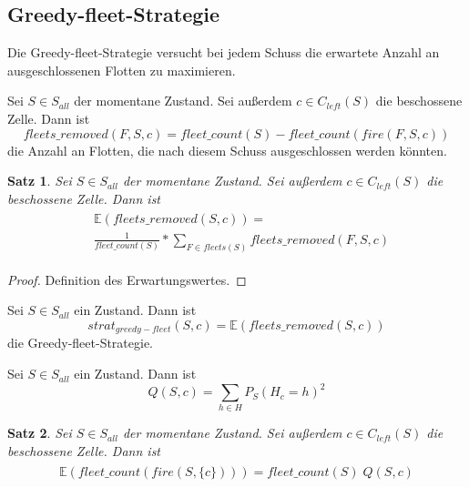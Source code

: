 \documentclass[a4paper,12pt]{llncs}
\numberwithin{equation}{section}
\newtheorem{satz}{Satz}
\begin{document}
\subsection{Greedy-fleet-Strategie}
Die Greedy-fleet-Strategie versucht bei jedem Schuss die erwartete Anzahl an ausgeschlossenen Flotten zu maximieren.

\begin{definition}
Sei $S\in S_{all}$ der momentane Zustand.
Sei außerdem $c \in C_{left}(S)$ die beschossene Zelle.
Dann ist
\[
fleets\_removed(F, S, c)=fleet\_count(S) - fleet\_count(fire(F, S,c))
\]
die Anzahl an Flotten, die nach diesem Schuss ausgeschlossen werden könnten.
\end{definition}

\begin{satz}
Sei $S\in S_{all}$ der momentane Zustand.
Sei außerdem $c \in C_{left}(S)$ die beschossene Zelle.
Dann ist
\begin{align}
\begin{split}
&\mathds{E}(fleets\_removed(S,c))=\\
&\frac{1}{fleet\_count(S)} * \sum_{F \in fleets(S)} fleets\_removed(F, S, c) \nonumber
\end{split}
\end{align}
\end{satz}

\begin{proof}
Definition des Erwartungswertes.
\end{proof}

\begin{definition}
Sei $S\in S_{all}$ ein Zustand.
Dann ist
\[
strat_{greedy-fleet}(S,c)=\mathds{E}(fleets\_removed(S,c))
\]
die Greedy-fleet-Strategie.
\end{definition}


\begin{definition}
Sei $S\in S_{all}$ ein Zustand.
Dann ist
\[
Q(S,c)=\sum_{h \in H} P_S(H_{c}=h)^2
\]
\end{definition}

\begin{satz}
Sei $S\in S_{all}$ der momentane Zustand.
Sei außerdem $c \in C_{left}(S)$ die beschossene Zelle.
Dann ist
\begin{align}
\begin{split}
\mathds{E}(fleet\_count(fire(S,\{c\})))=fleet\_count(S)\; Q(S,c)
\end{split}
\end{align}
\end{satz}
\end{document}
